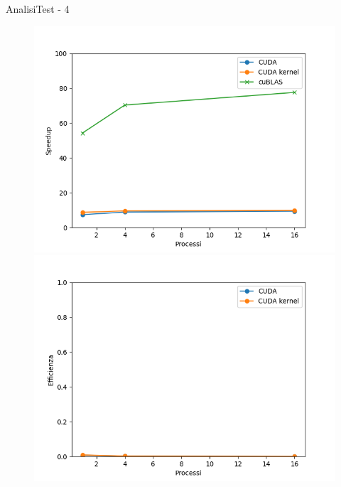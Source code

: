 \begin{frame}{Analisi}{Test - 4}
    \begin{figure}[H]
        \centering
        \begin{minipage}{0.48\textwidth}
            \includegraphics[width=\textwidth]{./imgs/graphs/caso_d_speedup.png}
        \end{minipage}
        \begin{minipage}{0.48\textwidth}
            \includegraphics[width=\textwidth]{./imgs/graphs/caso_d_efficiency.png}
        \end{minipage}
    \end{figure}
\end{frame}

